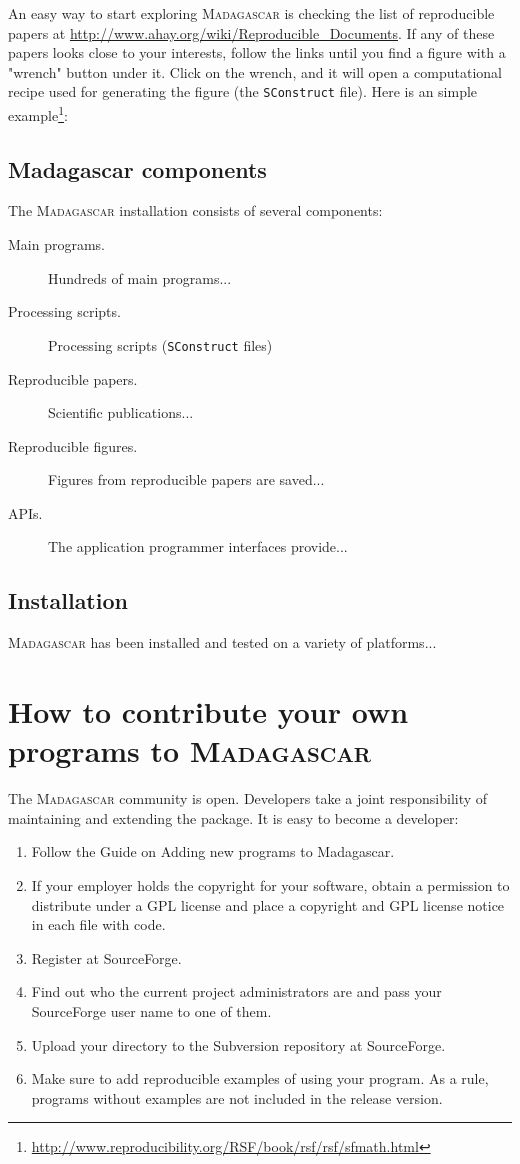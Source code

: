 An easy way to start exploring \textsc{Madagascar} is checking the
list of reproducible papers at
\url{http://www.ahay.org/wiki/Reproducible_Documents}.  If any of
these papers looks close to your interests, follow the links until you
find a figure with a "wrench" button under it. Click on the wrench,
and it will open a computational recipe used for generating the figure
(the \texttt{SConstruct} file). Here is an simple
example\footnote{\url{http://www.reproducibility.org/RSF/book/rsf/rsf/sfmath.html}}:

\subsection{Madagascar components}

The \textsc{Madagascar} installation consists of several components:
\begin{description}
\item[Main programs.] Hundreds of main programs...
\item[Processing scripts.] Processing scripts (\texttt{SConstruct} files)
\item[Reproducible papers.] Scientific publications...
\item[Reproducible figures.] Figures from reproducible papers are saved...
\item[APIs.] The application programmer interfaces provide...  
\end{description}

\subsection{Installation}

\textsc{Madagascar} has been installed and tested on a variety of platforms...

\section{How to contribute your own programs to \textsc{Madagascar}}

The \textsc{Madagascar} community is open. Developers take a joint
responsibility of maintaining and extending the package. It is easy to
become a developer:
\begin{enumerate}
\item  Follow the Guide on Adding new programs to Madagascar.
\item  If your employer holds the copyright for your software, 
obtain a permission to distribute under a GPL license and place a
copyright and GPL license notice in each file with code.
\item Register at SourceForge.
\item Find out who the current project administrators are and pass your SourceForge
user name to one of them.
\item Upload your directory to the Subversion repository at SourceForge.
\item Make sure to add reproducible examples of using your program. 
As a rule, programs without examples are not included in the release
version.
\end{enumerate}	

